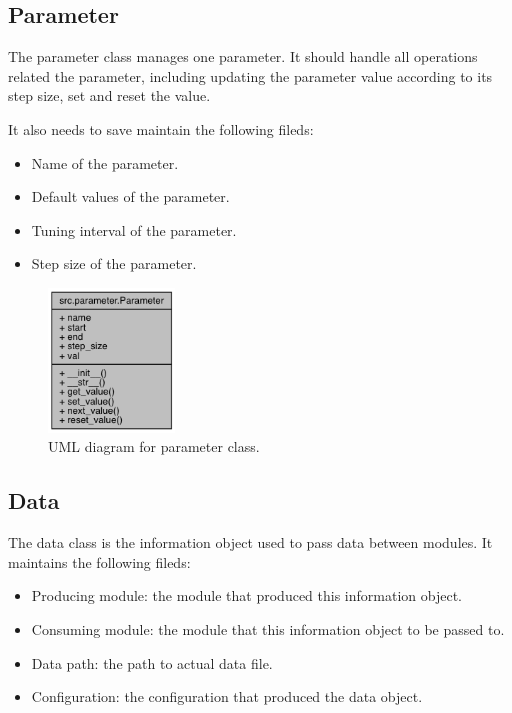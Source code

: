 \documentclass{article}
\begin{document}
    \subsection{Parameter}
    \label{sec:parameter}
    The parameter class manages one parameter.
    It should handle all operations related the parameter,
    including updating the parameter value according to its step size,
    set and reset the value.

    It also needs to save maintain the following fileds:
    \begin{itemize}
        \item Name of the parameter.
        \item Default values of the parameter.
        \item Tuning interval of the parameter.
        \item Step size of the parameter.
    \end{itemize}

    \begin{figure}[H]
        \begin{center}
            \includegraphics[width=0.3\textwidth]{fig/param_uml.png}
        \end{center}
        \label{fig:param_uml}
        \caption{UML diagram for parameter class.}
    \end{figure}

    \subsection{Data}
    \label{sec:infomation_object}
    The data class is the information object used to pass data between modules.
    It maintains the following fileds:
    \begin{itemize}
        \item Producing module: the module that produced this information object.
        \item Consuming module: the module that this information object to be passed to.
        \item Data path: the path to actual data file.
        \item Configuration: the configuration that produced the data object.
    \end{itemize}
\end{document}
